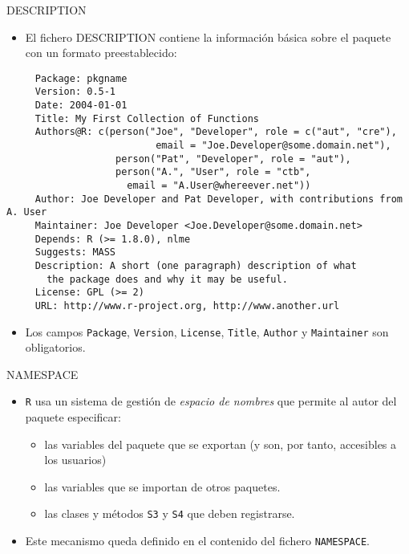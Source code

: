 \documentclass[xcolor={usenames,svgnames,dvipsnames}]{beamer}
\begin{document}
\begin{frame}[fragile,label={sec:org957e178}]{DESCRIPTION}
 \begin{itemize}
\item El fichero DESCRIPTION contiene la información básica sobre el
paquete con un formato preestablecido:
\end{itemize}
\begin{verbatim}
     Package: pkgname
     Version: 0.5-1
     Date: 2004-01-01
     Title: My First Collection of Functions
     Authors@R: c(person("Joe", "Developer", role = c("aut", "cre"),
                          email = "Joe.Developer@some.domain.net"),
                   person("Pat", "Developer", role = "aut"),
                   person("A.", "User", role = "ctb",
     	             email = "A.User@whereever.net"))
     Author: Joe Developer and Pat Developer, with contributions from A. User
     Maintainer: Joe Developer <Joe.Developer@some.domain.net>
     Depends: R (>= 1.8.0), nlme
     Suggests: MASS
     Description: A short (one paragraph) description of what
       the package does and why it may be useful.
     License: GPL (>= 2)
     URL: http://www.r-project.org, http://www.another.url
\end{verbatim}
\begin{itemize}
\item Los campos \texttt{Package}, \texttt{Version}, \texttt{License}, \texttt{Title}, \texttt{Author} y
\texttt{Maintainer} son obligatorios.
\end{itemize}
\end{frame}
\begin{frame}[fragile,label={sec:org7aef7b1}]{NAMESPACE}
 \begin{itemize}
\item \texttt{R} usa un sistema de gestión de \emph{espacio de nombres} que
permite al autor del paquete especificar:
\begin{itemize}
\item las variables del paquete que se exportan (y son, por tanto,
accesibles a los usuarios)
\item las variables que se importan de otros paquetes.
\item las clases y métodos \texttt{S3} y \texttt{S4} que deben registrarse.
\end{itemize}
\item Este mecanismo queda definido en el contenido del fichero
\texttt{NAMESPACE}.
\end{itemize}
\end{frame}
\end{document}
